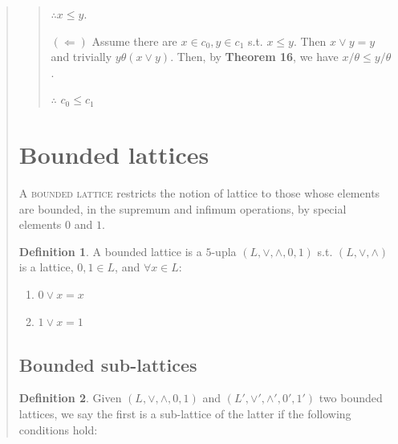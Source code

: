 \documentclass[a4paper, 12pt]{article}
\theoremstyle{definition}
\theoremstyle{definition}
\theoremstyle{definition}
\newtheorem{definition}{Definition}
\begin{document}
\begin{quote}
\begin{quote}
$\therefore x \leq y$.

$(\Leftarrow)$ Assume there are $x \in c_0, y \in c_1 $ s.t. $x \leq y$.
Then $x\lor  y = y$ and trivially $y\theta(x \lor y)$.
Then, by \textbf{Theorem 16}, we have $x / \theta \leq y / \theta$.

$\therefore $ $c_0 \leq c_1$

\end{quote}
\normalsize


\pagebreak 
{}
\section{Bounded lattices}

\lettrine{A}{ bounded lattice} restricts the notion of lattice to those 
whose elements are bounded, in the supremum and infimum operations, 
by special elements $0$ and $1$.

\begin{definition}
    A bounded lattice is a $5$-upla $(L, \lor, \land, 0, 1)$ s.t. $(L, \lor, \land)$ is a lattice, $0, 1 \in L$, and $\forall x \in L:$

    \begin{enumerate}
        \item $0 \lor x = x$
        \item $1 \lor  x = 1$
    \end{enumerate}
\end{definition}


\subsection{Bounded sub-lattices}

\begin{definition}
    Given $(L, \lor, \land, 0, 1)$ and $(L', \lor', \land', 0', 1')$ two bounded
    lattices, we say the first is a sub-lattice of the latter if the following
    conditions hold: 


\end{definition}
\end{quote}
\end{document}
